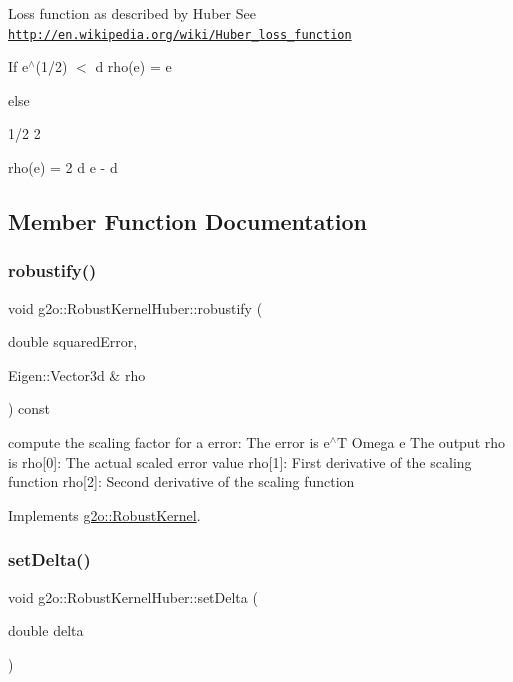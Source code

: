 Loss function as described by Huber See \href{http://en.wikipedia.org/wiki/Huber_loss_function}{\tt http\+://en.\+wikipedia.\+org/wiki/\+Huber\+\_\+loss\+\_\+function}

If e$^\wedge$(1/2) $<$ d rho(e) = e

else \begin{DoxyVerb}          1/2    2
\end{DoxyVerb}
 rho(e) = 2 d e -\/ d 

\subsection{Member Function Documentation}
\mbox{\label{classg2o_1_1_robust_kernel_huber_aa437e8a62360ba63b56b383aac8e4674}} 
\subsubsection{\texorpdfstring{robustify()}{robustify()}}
{\footnotesize\ttfamily void g2o\+::\+Robust\+Kernel\+Huber\+::robustify (\begin{DoxyParamCaption}\item[{double}]{squared\+Error,  }\item[{Eigen\+::\+Vector3d \&}]{rho }\end{DoxyParamCaption}) const\hspace{0.3cm}{\ttfamily [virtual]}}

compute the scaling factor for a error\+: The error is e$^\wedge$T Omega e The output rho is rho\mbox{[}0\mbox{]}\+: The actual scaled error value rho\mbox{[}1\mbox{]}\+: First derivative of the scaling function rho\mbox{[}2\mbox{]}\+: Second derivative of the scaling function 

Implements \mbox{\hyperlink{classg2o_1_1_robust_kernel_ab47b071a0cfe466be063f0104bc41d0f}{g2o\+::\+Robust\+Kernel}}.

\mbox{\label{classg2o_1_1_robust_kernel_huber_a7e9ee4bbc9483dcd3d10a4c1f506a4d2}} 
\subsubsection{\texorpdfstring{set\+Delta()}{setDelta()}}
{\footnotesize\ttfamily void g2o\+::\+Robust\+Kernel\+Huber\+::set\+Delta (\begin{DoxyParamCaption}\item[{double}]{delta }\end{DoxyParamCaption})\hspace{0.3cm}{\ttfamily [virtual]}}

